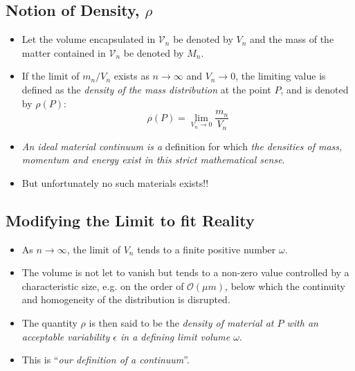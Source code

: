 \documentclass[11pt]{article}
\begin{document}
\subsection*{Notion of Density, \(\rho\)}
\label{sec:orgf751610}
\begin{itemize}
\item Let the volume encapsulated in \(\mathcal{V}_n\) be denoted by \(V_n\) and the mass of the matter contained in \(\mathcal{V}_n\) be denoted by \(M_n\).
\item If the limit of \(m_n/V_n\) exists as \(n \to \infty\) and \(V_n \to 0\), the limiting value is defined as the \emph{density of the mass distribution} at the point \(P\), and is denoted by \(\rho(P)\):
$$ \rho(P) = \lim_{V_n \to 0} \frac{m_n}{V_n} $$
\item \emph{An ideal material continuum is a} definition for which \emph{the densities of mass, momentum and energy exist in this strict mathematical sense}.
\item But unfortunately no such materials exists!!
\end{itemize}
\subsection*{Modifying the Limit to fit Reality}
\label{sec:org5478816}
\begin{itemize}
\item As \(n \to \infty\), the limit of \(V_n\) tends to a finite positive number \(\omega\).
\item The volume is not let to vanish but tends to a non-zero value controlled by a characteristic size, e.g. on the order of \(\mathcal{O}(\mu m)\), below which the continuity and homogeneity of the distribution is disrupted.
\item The quantity \(\rho\) is then said to be the \emph{density of material at \(P\) with an  acceptable variability \(\epsilon\) in a defining limit volume \(\omega\)}.
\item This is ``\emph{our definition of a continuum}''.
\end{itemize}
\end{document}
